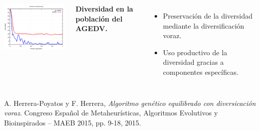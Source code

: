 {
		
	\begin{frame}{}
		
		\fontsize{9}{10}\selectfont
			
		\begin{columns}[c]
			
			
			\kern 0.5cm
			\centering \includegraphics[width=7cm]{./Images/Diversity/AGEDV/png/berlin52.png}
			
			
			\fontsize{9}{10}
			\selectfont
			\begin{center}
				\textbf{Diversidad en la población del AGEDV.}
			\end{center}			

			\kern -0.35cm

			\fontsize{8}{10}\selectfont
			\begin{itemize}
				\item Preservación de la diversidad mediante la {\color{red}diversificación voraz}.
				\item Uso productivo de la diversidad gracias a componentes específicas.

			\end{itemize}
			
		\end{columns}
		
		\kern 4mm
		\fontsize{6}{6}\selectfont

		\begin{tcolorbox}[colback=white,colframe=blue!30]
		\centering
		A. Herrera-Poyatos y F. Herrera, \textit{Algoritmo genético equilibrado con diversicación voraz}. Congreso Español
		de Metaheurísticas, Algoritmos Evolutivos y Bioinspirados – MAEB 2015, pp. 9-18, 2015.
		\end{tcolorbox}
			
	\end{frame}
}

